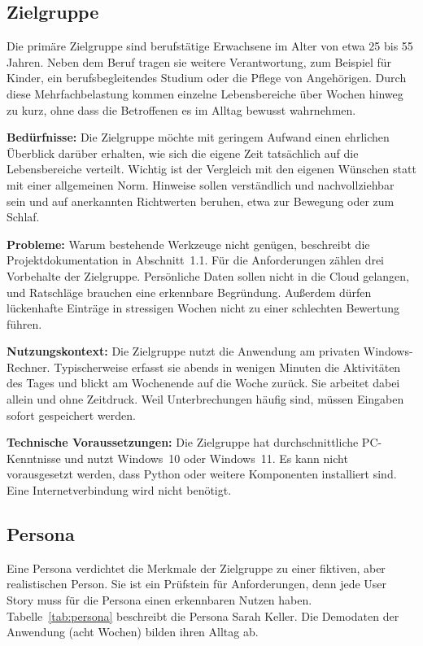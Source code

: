 \subsection{Zielgruppe}
Die primäre Zielgruppe sind berufstätige Erwachsene im Alter von etwa 25 bis 55 Jahren. Neben dem Beruf tragen sie weitere Verantwortung, zum Beispiel für Kinder, ein berufsbegleitendes Studium oder die Pflege von Angehörigen. Durch diese Mehrfachbelastung kommen einzelne Lebensbereiche über Wochen hinweg zu kurz, ohne dass die Betroffenen es im Alltag bewusst wahrnehmen.

\textbf{Bedürfnisse:} Die Zielgruppe möchte mit geringem Aufwand einen ehrlichen Überblick darüber erhalten, wie sich die eigene Zeit tatsächlich auf die Lebensbereiche verteilt. Wichtig ist der Vergleich mit den eigenen Wünschen statt mit einer allgemeinen Norm. Hinweise sollen verständlich und nachvollziehbar sein und auf anerkannten Richtwerten beruhen, etwa zur Bewegung oder zum Schlaf.

\textbf{Probleme:} Warum bestehende Werkzeuge nicht genügen, beschreibt die Projektdokumentation in Abschnitt~1.1. Für die Anforderungen zählen drei Vorbehalte der Zielgruppe. Persönliche Daten sollen nicht in die Cloud gelangen, und Ratschläge brauchen eine erkennbare Begründung. Außerdem dürfen lückenhafte Einträge in stressigen Wochen nicht zu einer schlechten Bewertung führen.

\textbf{Nutzungskontext:} Die Zielgruppe nutzt die Anwendung am privaten Windows-Rechner. Typischerweise erfasst sie abends in wenigen Minuten die Aktivitäten des Tages und blickt am Wochenende auf die Woche zurück. Sie arbeitet dabei allein und ohne Zeitdruck. Weil Unterbrechungen häufig sind, müssen Eingaben sofort gespeichert werden.

\textbf{Technische Voraussetzungen:} Die Zielgruppe hat durchschnittliche PC-Kenntnisse und nutzt Windows~10 oder Windows~11. Es kann nicht vorausgesetzt werden, dass Python oder weitere Komponenten installiert sind. Eine Internetverbindung wird nicht benötigt.

\subsection{Persona}\label{sec:persona}
Eine Persona verdichtet die Merkmale der Zielgruppe zu einer fiktiven, aber realistischen Person. Sie ist ein Prüfstein für Anforderungen, denn jede User Story muss für die Persona einen erkennbaren Nutzen haben. Tabelle~\ref{tab:persona} beschreibt die Persona Sarah Keller. Die Demodaten der Anwendung (acht Wochen) bilden ihren Alltag ab.

